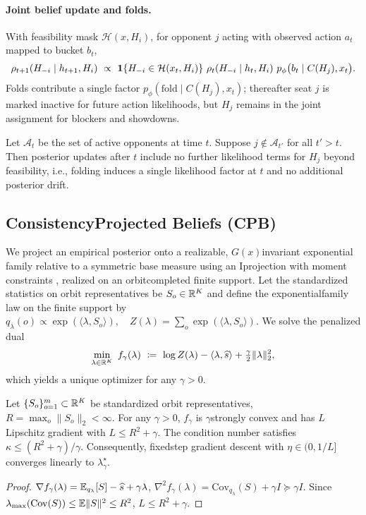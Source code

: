 \paragraph{Joint belief update and folds.}
With feasibility mask $\mathcal{H}(x,H_i)$, for opponent $j$ acting with observed action $a_t$ mapped to bucket $b_t$,
\[
\rho_{t+1}(H_{-i}\mid h_{t+1},H_i)\ \propto\ \1\{H_{-i}\in\mathcal{H}(x_t,H_i)\}\ \rho_t(H_{-i}\mid h_t,H_i)\ p_\phi\big(b_t\mid C(H_j),x_t\big).
\]
Folds contribute a single factor $p_\phi(\mathrm{fold}\mid C(H_j),x_t)$; thereafter seat $j$ is marked inactive for future action likelihoods, but $H_j$ remains in the joint assignment for blockers and showdowns.

\begin{proposition}
Let $\mathcal{A}_t$ be the set of active opponents at time $t$. Suppose $j\notin\mathcal{A}_{t'}$ for all $t'>t$. Then posterior updates after $t$ include no further likelihood terms for $H_j$ beyond feasibility, i.e., folding induces a single likelihood factor at $t$ and no additional posterior drift.
\end{proposition}

\subsection{Consistency\textendash Projected Beliefs (CPB)}
We project an empirical posterior onto a realizable, $G(x)$\textendash invariant exponential family relative to a symmetric base measure using an I\textendash projection with moment constraints \cite{csiszar1975i}, realized on an orbit\textendash completed finite support. Let the standardized statistics on orbit representatives be $S_o\in\mathbb{R}^K$ and define the exponential\textendash family law on the finite support by
$
q_\lambda(o) \propto \exp(\langle \lambda, S_o\rangle),\quad Z(\lambda)=\sum_{o}\exp(\langle \lambda, S_o\rangle).
$
We solve the penalized dual
\[
\min_{\lambda\in\R^K}\ f_\gamma(\lambda)\ \coloneqq\ \log Z(\lambda) - \langle \lambda,\widehat s\rangle + \tfrac{\gamma}{2}\|\lambda\|_2^2,
\]
which yields a unique optimizer for any $\gamma>0$.

\begin{theorem}\label{thm:cpb-strong}
Let $\{S_o\}_{o=1}^m\subset\mathbb{R}^K$ be standardized orbit representatives, $R=\max_o \|S_o\|_2<\infty$. For any $\gamma>0$, $f_\gamma$ is $\gamma$\textendash strongly convex and has $L$\textendash Lipschitz gradient with $L \le R^2+\gamma$. The condition number satisfies $\kappa\le (R^2+\gamma)/\gamma$. Consequently, fixed\textendash step gradient descent with $\eta\in(0,1/L]$ converges linearly to $\lambda^\star_\gamma$.
\end{theorem}
\begin{proof}
$\nabla f_\gamma(\lambda)=\mathbb{E}_{q_\lambda}[S]-\widehat s+\gamma\lambda$, $\nabla^2 f_\gamma(\lambda)=\mathrm{Cov}_{q_\lambda}(S)+\gamma I\succeq \gamma I$. Since $\lambda_{\max}(\mathrm{Cov}(S))\le \mathbb{E}\|S\|^2\le R^2$, $L\le R^2+\gamma$.
\end{proof}

